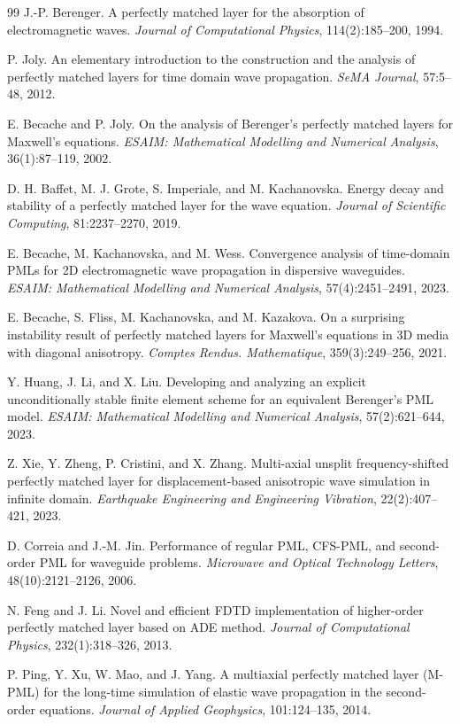 \documentclass[UTF8,a4paper,11pt]{ctexart}
\begin{document}
\begin{thebibliography}{99}
J.-P. Berenger.
\newblock A perfectly matched layer for the absorption of electromagnetic waves.
\newblock \emph{Journal of Computational Physics}, 114(2):185--200, 1994.

P. Joly.
\newblock An elementary introduction to the construction and the analysis of perfectly matched layers for time domain wave propagation.
\newblock \emph{SeMA Journal}, 57:5--48, 2012.

E. Becache and P. Joly.
\newblock On the analysis of Berenger's perfectly matched layers for Maxwell's equations.
\newblock \emph{ESAIM: Mathematical Modelling and Numerical Analysis}, 36(1):87--119, 2002.

D. H. Baffet, M. J. Grote, S. Imperiale, and M. Kachanovska.
\newblock Energy decay and stability of a perfectly matched layer for the wave equation.
\newblock \emph{Journal of Scientific Computing}, 81:2237--2270, 2019.

E. Becache, M. Kachanovska, and M. Wess.
\newblock Convergence analysis of time-domain PMLs for 2D electromagnetic wave propagation in dispersive waveguides.
\newblock \emph{ESAIM: Mathematical Modelling and Numerical Analysis}, 57(4):2451--2491, 2023.

E. Becache, S. Fliss, M. Kachanovska, and M. Kazakova.
\newblock On a surprising instability result of perfectly matched layers for Maxwell's equations in 3D media with diagonal anisotropy.
\newblock \emph{Comptes Rendus. Mathematique}, 359(3):249--256, 2021.

Y. Huang, J. Li, and X. Liu.
\newblock Developing and analyzing an explicit unconditionally stable finite element scheme for an equivalent Berenger's PML model.
\newblock \emph{ESAIM: Mathematical Modelling and Numerical Analysis}, 57(2):621--644, 2023.

Z. Xie, Y. Zheng, P. Cristini, and X. Zhang.
\newblock Multi-axial unsplit frequency-shifted perfectly matched layer for displacement-based anisotropic wave simulation in infinite domain.
\newblock \emph{Earthquake Engineering and Engineering Vibration}, 22(2):407--421, 2023.

D. Correia and J.-M. Jin.
\newblock Performance of regular PML, CFS-PML, and second-order PML for waveguide problems.
\newblock \emph{Microwave and Optical Technology Letters}, 48(10):2121--2126, 2006.

N. Feng and J. Li.
\newblock Novel and efficient FDTD implementation of higher-order perfectly matched layer based on ADE method.
\newblock \emph{Journal of Computational Physics}, 232(1):318--326, 2013.

P. Ping, Y. Xu, W. Mao, and J. Yang.
\newblock A multiaxial perfectly matched layer (M-PML) for the long-time simulation of elastic wave propagation in the second-order equations.
\newblock \emph{Journal of Applied Geophysics}, 101:124--135, 2014.
\end{thebibliography}
\end{document}
